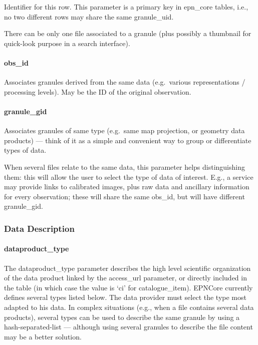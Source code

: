 \documentclass[11pt,a4paper]{ivoa}
\begin{document}
Identifier for this row. This parameter is a primary key in epn\_core
tables, i.e., no two different rows may share the same granule\_uid.

There can be only one file associated to a granule (plus possibly a
thumbnail for quick-look purpose in a search interface).

\paragraph{obs\_id}

Associates granules derived from the same data (e.g.\ various
representations / processing levels). May be the ID of the original
observation.

\paragraph{granule\_gid}

Associates granules of same type (e.g.\ same map projection, or geometry
data products) --- think of it as a simple and convenient way to group or
differentiate types of data.

When several files relate to the same data, this parameter helps
distinguishing them: this will allow the user to select the type of data
of interest. E.g., a service may provide links to calibrated images,
plus raw data and ancillary information for every observation; these
will share the same obs\_id, but will have different granule\_gid.

\subsubsection{Data Description}

\paragraph{dataproduct\_type}

The dataproduct\_type parameter describes the high level scientific
organization of the data product linked by the access\_url parameter,
or directly included in the table (in which case the value is `ci'
for catalogue\_item). EPNCore currently defines several types listed
below. The data provider must select the type most adapted to his
data. In complex situations (e.g., when a file contains several data
products), several types can be used to describe the same granule by
using a hash-separated-list — although using several granules to
describe the file content may be a better solution.
\end{document}
